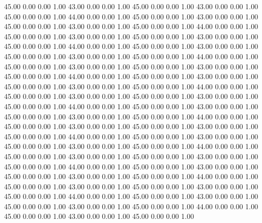    45.00   0.00   0.00   1.00
   43.00   0.00   0.00   1.00
   45.00   0.00   0.00   1.00
   43.00   0.00   0.00   1.00
   45.00   0.00   0.00   1.00
   44.00   0.00   0.00   1.00
   45.00   0.00   0.00   1.00
   43.00   0.00   0.00   1.00
   45.00   0.00   0.00   1.00
   43.00   0.00   0.00   1.00
   45.00   0.00   0.00   1.00
   44.00   0.00   0.00   1.00
   45.00   0.00   0.00   1.00
   43.00   0.00   0.00   1.00
   45.00   0.00   0.00   1.00
   43.00   0.00   0.00   1.00
   45.00   0.00   0.00   1.00
   44.00   0.00   0.00   1.00
   45.00   0.00   0.00   1.00
   43.00   0.00   0.00   1.00
   45.00   0.00   0.00   1.00
   43.00   0.00   0.00   1.00
   45.00   0.00   0.00   1.00
   44.00   0.00   0.00   1.00
   45.00   0.00   0.00   1.00
   43.00   0.00   0.00   1.00
   45.00   0.00   0.00   1.00
   43.00   0.00   0.00   1.00
   45.00   0.00   0.00   1.00
   44.00   0.00   0.00   1.00
   45.00   0.00   0.00   1.00
   43.00   0.00   0.00   1.00
   45.00   0.00   0.00   1.00
   43.00   0.00   0.00   1.00
   45.00   0.00   0.00   1.00
   44.00   0.00   0.00   1.00
   45.00   0.00   0.00   1.00
   43.00   0.00   0.00   1.00
   45.00   0.00   0.00   1.00
   43.00   0.00   0.00   1.00
   45.00   0.00   0.00   1.00
   44.00   0.00   0.00   1.00
   45.00   0.00   0.00   1.00
   43.00   0.00   0.00   1.00
   45.00   0.00   0.00   1.00
   43.00   0.00   0.00   1.00
   45.00   0.00   0.00   1.00
   44.00   0.00   0.00   1.00
   45.00   0.00   0.00   1.00
   43.00   0.00   0.00   1.00
   45.00   0.00   0.00   1.00
   43.00   0.00   0.00   1.00
   45.00   0.00   0.00   1.00
   44.00   0.00   0.00   1.00
   45.00   0.00   0.00   1.00
   43.00   0.00   0.00   1.00
   45.00   0.00   0.00   1.00
   43.00   0.00   0.00   1.00
   45.00   0.00   0.00   1.00
   44.00   0.00   0.00   1.00
   45.00   0.00   0.00   1.00
   43.00   0.00   0.00   1.00
   45.00   0.00   0.00   1.00
   43.00   0.00   0.00   1.00
   45.00   0.00   0.00   1.00
   44.00   0.00   0.00   1.00
   45.00   0.00   0.00   1.00
   43.00   0.00   0.00   1.00
   45.00   0.00   0.00   1.00
   43.00   0.00   0.00   1.00
   45.00   0.00   0.00   1.00
   44.00   0.00   0.00   1.00
   45.00   0.00   0.00   1.00
   43.00   0.00   0.00   1.00
   45.00   0.00   0.00   1.00
   43.00   0.00   0.00   1.00
   45.00   0.00   0.00   1.00
   44.00   0.00   0.00   1.00
   45.00   0.00   0.00   1.00
   43.00   0.00   0.00   1.00
   45.00   0.00   0.00   1.00
   43.00   0.00   0.00   1.00
   45.00   0.00   0.00   1.00
   44.00   0.00   0.00   1.00
   45.00   0.00   0.00   1.00
   43.00   0.00   0.00   1.00
   45.00   0.00   0.00   1.00
